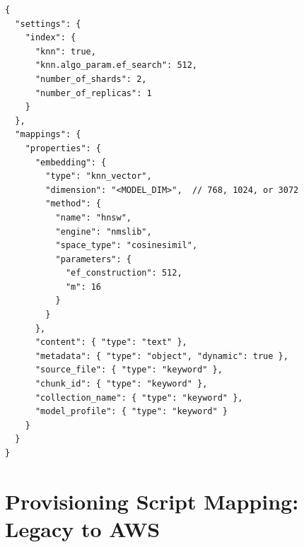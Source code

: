 \documentclass[11pt,letterpaper]{article}
\begin{document}
\begin{lstlisting}[caption={OpenSearch index mapping (model-aware).}]
{
  "settings": {
    "index": {
      "knn": true,
      "knn.algo_param.ef_search": 512,
      "number_of_shards": 2,
      "number_of_replicas": 1
    }
  },
  "mappings": {
    "properties": {
      "embedding": {
        "type": "knn_vector",
        "dimension": "<MODEL_DIM>",  // 768, 1024, or 3072
        "method": {
          "name": "hnsw",
          "engine": "nmslib",
          "space_type": "cosinesimil",
          "parameters": {
            "ef_construction": 512,
            "m": 16
          }
        }
      },
      "content": { "type": "text" },
      "metadata": { "type": "object", "dynamic": true },
      "source_file": { "type": "keyword" },
      "chunk_id": { "type": "keyword" },
      "collection_name": { "type": "keyword" },
      "model_profile": { "type": "keyword" }
    }
  }
}
\end{lstlisting}

\section{Provisioning Script Mapping: Legacy to AWS}
\label{app:provisioning-mapping}
\end{document}
